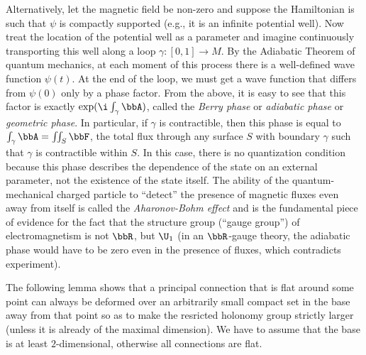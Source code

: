 \begin{example}
    Alternatively, let the magnetic field be non-zero and suppose the Hamiltonian is such that $\psi$ is compactly supported (e.g., it is an infinite potential well). Now treat the location of the potential well as a parameter and imagine continuously transporting this well along a loop $\gamma:[0,1]\to M$. By the Adiabatic Theorem of quantum mechanics, at each moment of this process there is a well-defined wave function $\psi(t)$. At the end of the loop, we must get a wave function that differs from $\psi(0)$ only by a phase factor. From the above, it is easy to see that this factor is exactly $\exp(\i\int_\gamma \bbA)$, called the \emph{Berry phase} or \emph{adiabatic phase} or \emph{geometric phase}. In particular, if $\gamma$ is contractible, then this phase is equal to $\int_\gamma\bbA=\iint_S \bbF$, the total flux through any surface $S$ with boundary $\gamma$ such that $\gamma$ is contractible within $S$. In this case, there is no quantization condition because this phase describes the dependence of the state on an external parameter, not the existence of the state itself. The ability of the quantum-mechanical charged particle to ``detect'' the presence of magnetic fluxes even away from itself is called the \emph{Aharonov-Bohm effect} and is the fundamental piece of evidence for the fact that the structure group (``gauge group'') of electromagnetism is not $\bbR$, but $\U_1$ (in an $\bbR$-gauge theory, the adiabatic phase would have to be zero even in the presence of fluxes, which contradicts experiment).

\end{example}

The following lemma shows that a principal connection that is flat around some point can always be deformed over an arbitrarily small compact set in the base away from that point so as to make the resricted holonomy group strictly larger (unless it is already of the maximal dimension). We have to assume that the base is at least $2$-dimensional, otherwise all connections are flat.


